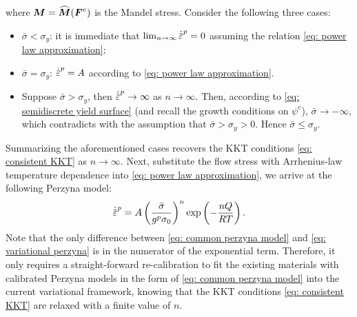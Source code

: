 where $\boldsymbol{M} = \widehat{\boldsymbol{M}}(\boldsymbol{F}^e)$ is the Mandel stress. Consider the following three cases:
\begin{itemize}
  \item $\bar{\sigma} < \sigma_y$: it is immediate that $\lim_{n\to\infty} \epdot = 0$ assuming the relation \eqref{eq: power law approximation};
  \item $\bar{\sigma} = \sigma_y$: $\epdot = A$ according to \eqref{eq: power law approximation}.
  \item Suppose $\bar{\sigma} > \sigma_y$, then $\epdot \to \infty$ as $n \to \infty$. Then, according to \eqref{eq: semidiscrete yield surface} (and recall the growth conditions on $\psi^e$), $\bar{\sigma} \to -\infty$, which contradicts with the assumption that $\bar{\sigma} > \sigma_y > 0$. Hence $\bar{\sigma} \leqslant \sigma_y$.
\end{itemize}
Summarizing the aforementioned cases recovers the KKT conditions \eqref{eq: consistent KKT} as $n \to \infty$. Next, substitute the flow stress with Arrhenius-law temperature dependence into \eqref{eq: power law approximation}, we arrive at the following Perzyna model:
\begin{align}
  \epdot = A \left( \dfrac{\bar{\sigma}}{g^p \sigma_0} \right)^n \exp\left( -\dfrac{nQ}{RT} \right). \label{eq: variational perzyna}
\end{align}
Note that the only difference between \eqref{eq: common perzyna model} and \eqref{eq: variational perzyna} is in the numerator of the exponential term. Therefore, it only requires a straight-forward re-calibration to fit the existing materials with calibrated Perzyna models in the form of \eqref{eq: common perzyna model} into the current variational framework, knowing that the KKT conditions \eqref{eq: consistent KKT} are relaxed with a finite value of $n$.


